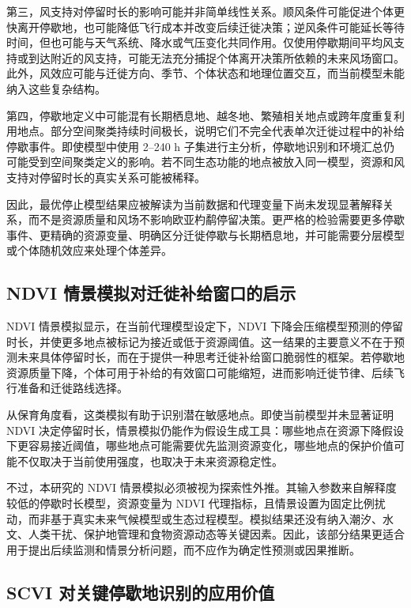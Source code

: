 \documentclass[UTF8,a4paper,12pt]{ctexart}
\begin{document}
第三，风支持对停留时长的影响可能并非简单线性关系。顺风条件可能促进个体更快离开停歇地，也可能降低飞行成本并改变后续迁徙决策；逆风条件可能延长等待时间，但也可能与天气系统、降水或气压变化共同作用。仅使用停歇期间平均风支持或到达附近的风支持，可能无法充分捕捉个体离开决策所依赖的未来风场窗口。此外，风效应可能与迁徙方向、季节、个体状态和地理位置交互，而当前模型未能纳入这些复杂结构。

第四，停歇地定义中可能混有长期栖息地、越冬地、繁殖相关地点或跨年度重复利用地点。部分空间聚类持续时间极长，说明它们不完全代表单次迁徙过程中的补给停歇事件。即使模型中使用 2--240 h 子集进行主分析，停歇地识别和环境汇总仍可能受到空间聚类定义的影响。若不同生态功能的地点被放入同一模型，资源和风支持对停留时长的真实关系可能被稀释。

因此，最优停止模型结果应被解读为当前数据和代理变量下尚未发现显著解释关系，而不是资源质量和风场不影响欧亚杓鹬停留决策。更严格的检验需要更多停歇事件、更精确的资源变量、明确区分迁徙停歇与长期栖息地，并可能需要分层模型或个体随机效应来处理个体差异。

\subsection{NDVI 情景模拟对迁徙补给窗口的启示}

NDVI 情景模拟显示，在当前代理模型设定下，NDVI 下降会压缩模型预测的停留时长，并使更多地点被标记为接近或低于资源阈值。这一结果的主要意义不在于预测未来具体停留时长，而在于提供一种思考迁徙补给窗口脆弱性的框架。若停歇地资源质量下降，个体可用于补给的有效窗口可能缩短，进而影响迁徙节律、后续飞行准备和迁徙路线选择。

从保育角度看，这类模拟有助于识别潜在敏感地点。即使当前模型并未显著证明 NDVI 决定停留时长，情景模拟仍能作为假设生成工具：哪些地点在资源下降假设下更容易接近阈值，哪些地点可能需要优先监测资源变化，哪些地点的保护价值可能不仅取决于当前使用强度，也取决于未来资源稳定性。

不过，本研究的 NDVI 情景模拟必须被视为探索性外推。其输入参数来自解释度较低的停歇时长模型，资源变量为 NDVI 代理指标，且情景设置为固定比例扰动，而非基于真实未来气候模型或生态过程模型。模拟结果还没有纳入潮汐、水文、人类干扰、保护地管理和食物资源动态等关键因素。因此，该部分结果更适合用于提出后续监测和情景分析问题，而不应作为确定性预测或因果推断。

\subsection{SCVI 对关键停歇地识别的应用价值}
\end{document}
